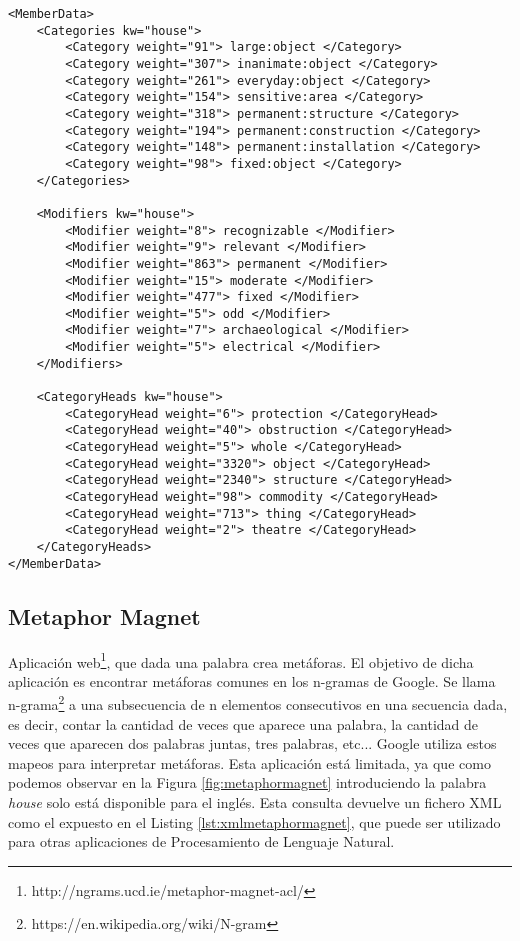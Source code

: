 \lstset{language=XML}
\begin{lstlisting}[caption= Ejemplo formatos XML Thesaurus Rex, label={lst:xmlthesaurusrex}, frame=single]
<MemberData>
	<Categories kw="house">
		<Category weight="91"> large:object </Category>
		<Category weight="307"> inanimate:object </Category>
		<Category weight="261"> everyday:object </Category>
		<Category weight="154"> sensitive:area </Category>
		<Category weight="318"> permanent:structure </Category>
		<Category weight="194"> permanent:construction </Category>
		<Category weight="148"> permanent:installation </Category>
		<Category weight="98"> fixed:object </Category>
	</Categories>
	
	<Modifiers kw="house">
		<Modifier weight="8"> recognizable </Modifier>
		<Modifier weight="9"> relevant </Modifier>
		<Modifier weight="863"> permanent </Modifier>
		<Modifier weight="15"> moderate </Modifier>
		<Modifier weight="477"> fixed </Modifier>
		<Modifier weight="5"> odd </Modifier>
		<Modifier weight="7"> archaeological </Modifier>
		<Modifier weight="5"> electrical </Modifier>
	</Modifiers>
	
	<CategoryHeads kw="house">
		<CategoryHead weight="6"> protection </CategoryHead>
		<CategoryHead weight="40"> obstruction </CategoryHead>
		<CategoryHead weight="5"> whole </CategoryHead>
		<CategoryHead weight="3320"> object </CategoryHead>
		<CategoryHead weight="2340"> structure </CategoryHead>
		<CategoryHead weight="98"> commodity </CategoryHead>
		<CategoryHead weight="713"> thing </CategoryHead>
		<CategoryHead weight="2"> theatre </CategoryHead>
	</CategoryHeads>
</MemberData>

\end{lstlisting}



\subsection{Metaphor Magnet}
\label{cap:subsec:metaphormagnet}
Aplicación web\footnote{http://ngrams.ucd.ie/metaphor-magnet-acl/}, que dada una palabra crea metáforas. El objetivo \citep{VealeT2012} de dicha aplicación es encontrar metáforas comunes en los n-gramas de Google. Se llama n-grama\footnote{https://en.wikipedia.org/wiki/N-gram} a una subsecuencia de n elementos consecutivos en una secuencia dada, es decir, contar la cantidad de veces que aparece una palabra, la cantidad de veces que aparecen dos palabras juntas, tres palabras, etc... Google utiliza estos mapeos para interpretar metáforas. Esta aplicación está limitada, ya que como podemos observar en la Figura \ref{fig:metaphormagnet} introduciendo la palabra \textit{house} solo está disponible para el inglés.
Esta consulta devuelve un fichero XML como el expuesto en el Listing \ref{lst:xmlmetaphormagnet}, que puede ser utilizado para otras aplicaciones de Procesamiento de Lenguaje Natural.


